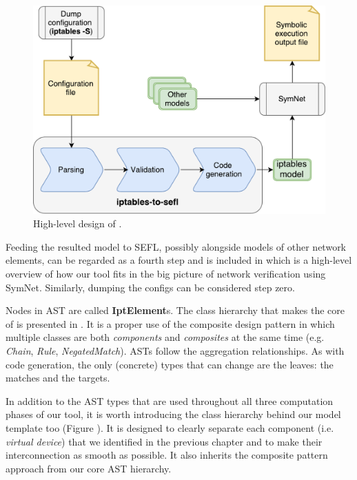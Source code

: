 \begin{figure}[h]
  \centering
  \captionsetup{justification=centering}
  \includegraphics[scale=0.5]{src/img/high-level-design}
  \caption{High-level design of \TOOL.}
  \label{fig:high-level-design}
\end{figure}

Feeding the resulted model to SEFL, possibly alongside models of other network
elements, can be regarded as a fourth step and is included in
 which is a high-level overview of
how our tool fits in the big picture of network verification using SymNet.
Similarly, dumping the configs can be considered step zero.

Nodes in AST are called \textbf{IptElement}s.  The class hierarchy that makes
the core of \TOOL is presented in .
It is a proper use of the composite design pattern in which multiple classes
are both \emph{components} and \emph{composites} at the same time (e.g.
\emph{Chain}, \emph{Rule}, \emph{NegatedMatch}).  ASTs follow the aggregation
relationships.  As with code generation, the only (concrete) types that can
change are the leaves: the matches and the targets.

In addition to the AST types that are used throughout all three computation
phases of our tool, it is worth introducing the class hierarchy behind our
model template too (Figure ).  It
is designed to clearly separate each component (i.e.  \emph{virtual device})
that we identified in the previous chapter and to make their interconnection as
smooth as possible. It also inherits the composite pattern approach from our
core AST hierarchy.

